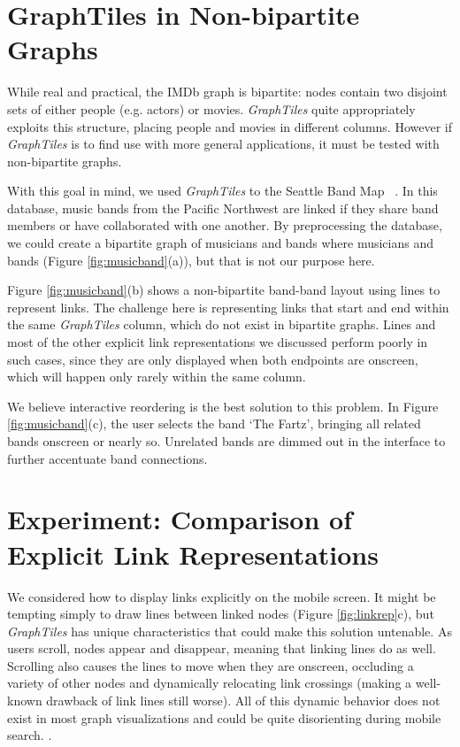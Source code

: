 \documentclass{sigchi}
\begin{document}
\section{GraphTiles in Non-bipartite Graphs}

While real and practical, the IMDb graph is bipartite: nodes contain two disjoint sets of either people (e.g. actors) or movies. \textit{GraphTiles} quite appropriately exploits this structure, placing people and movies in different columns. However if \textit{GraphTiles} is to find use with more general applications, it must be tested with non-bipartite graphs. 

With this goal in mind, we used \textit{GraphTiles} to the Seattle Band Map ~\cite{seattleband}. In this database, music bands from the Pacific Northwest are linked if they share band members or have collaborated with one another. By preprocessing the database, we could create a bipartite graph of musicians and bands where musicians and bands (Figure \ref{fig:musicband}(a)), but that is not our purpose here. 

Figure \ref{fig:musicband}(b) shows a non-bipartite band-band layout using lines to represent links. The challenge here is representing links that start and end within the same \textit{GraphTiles} column, which do not exist in bipartite graphs. Lines and most of the other explicit link representations we discussed perform poorly in such cases, since they are only displayed when both endpoints are onscreen, which will happen only rarely within the same column.

We believe interactive reordering is the best solution to this problem. In Figure \ref{fig:musicband}(c), the user selects the band `The Fartz', bringing all related bands onscreen or nearly so. Unrelated bands are dimmed out in the interface to further accentuate band connections.


\section{Experiment: Comparison of Explicit Link Representations}


We considered how to display links explicitly on the mobile screen. It might be tempting simply to draw lines between linked nodes (Figure \ref{fig:linkrep}c), but \textit{GraphTiles} has unique characteristics that could make this solution untenable. As users scroll, nodes appear and disappear, meaning that linking lines do as well. Scrolling also causes the lines to move when they are onscreen, occluding a variety of other nodes and dynamically relocating link crossings (making a well-known drawback of link lines still worse). All of this dynamic behavior does not exist in most graph visualizations and could be quite disorienting during mobile search. .
\end{document}
